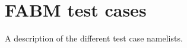 \chapter{FABM test cases\label{chap:testcases}}

A description of the different test case namelists.


